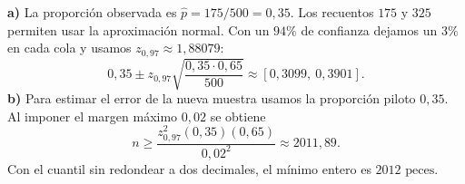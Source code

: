\textbf{a)} La proporción observada es $\hat p=175/500=0{,}35$. Los recuentos $175$ y $325$ permiten usar la aproximación normal. Con un $94\%$ de confianza dejamos un $3\%$ en cada cola y usamos $z_{0{,}97}\approx1{,}88079$:
\[
0{,}35\pm z_{0{,}97}\sqrt{\frac{0{,}35\cdot0{,}65}{500}}
\approx\boxed{[0{,}3099,\ 0{,}3901]}.
\]
\textbf{b)} Para estimar el error de la nueva muestra usamos la proporción piloto $0{,}35$. Al imponer el margen máximo $0{,}02$ se obtiene
\[
n\ge\frac{z_{0{,}97}^2(0{,}35)(0{,}65)}{0{,}02^2}\approx2011{,}89.
\]
Con el cuantil sin redondear a dos decimales, el mínimo entero es $\boxed{2012\text{ peces}}$.
